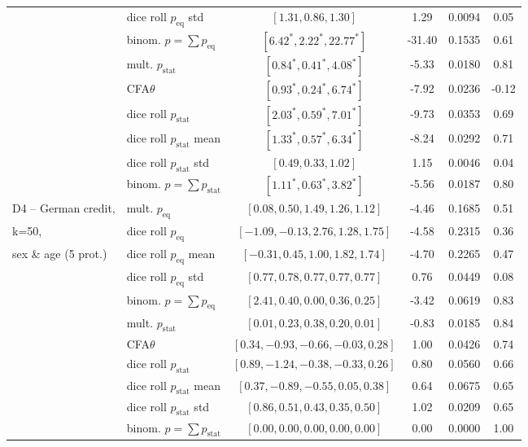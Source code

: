 \begin{table}[t!]
{\begin{tabular}{llcccc}
								& dice roll $p_{\text{eq}}$	std	& $[1.31, 0.86, 1.30]$	& 1.29	& 0.0094 & 0.05\\
								& binom. \algoFAIR $p = \sum p_{\text{eq}}$	& $[6.42^*,2.22^*, 22.77^*]$		&-31.40		& 0.1535 	& 0.61 \\
								\cline{2-6}
								& mult. \algoFAIR  $p_{\text{stat}}$ 	& $[0.84^*, 0.41^*, 4.08^*]$ 	& -5.33		& 0.0180 & 0.81\\
							 	& CFA$\theta$ 					& $[0.93^*, 0.24^*, 6.74^*]$ 	& -7.92		& 0.0236 & -0.12 \\
								& dice roll $p_{\text{stat}}$	& $[2.03^*, 0.59^*, 7.01^*]$	& -9.73		& 0.0353 & 0.69 \\
								& dice roll $p_{\text{stat}}$	mean & $[1.33^*, 0.57^*, 6.34^*]$	& -8.24		& 0.0292 & 0.71 \\
								& dice roll $p_{\text{stat}}$ std	& $[0.49, 0.33, 1.02]$	& 1.15		& 0.0046 & 0.04 \\
								& binom. \algoFAIR $p = \sum p_{\text{stat}}$	& $[1.11^*, 0.63^*, 3.82^*]$		& -5.56		& 0.0187 	& 0.80 \\
		\midrule
		\midrule
		D4 -- German credit, 	& mult. \algoFAIR $p_{\text{eq}}$ 	&  $[0.08, 0.50, 1.49, 1.26, 1.12]$ 	& -4.46 &	0.1685	& 0.51 \\
		k=50,					& dice roll $p_{\text{eq}}$		& $[-1.09, -0.13, 2.76, 1.28, 1.75]$	& -4.58	& 0.2315 & 0.36\\
		sex \& age (5 prot.)	& dice roll $p_{\text{eq}}$	mean	& $[-0.31, 0.45, 1.00, 1.82, 1.74]$	& -4.70	& 0.2265 & 0.47\\
								& dice roll $p_{\text{eq}}$	std	& $[0.77, 0.78, 0.77, 0.77, 0.77]$	& 0.76	& 0.0449 & 0.08\\
								& binom. \algoFAIR $p = \sum p_{\text{eq}}$	& $[2.41,0.40, 0.00, 0.36, 0.25]$	&-3.42	& 0.0619 	& 0.83 \\
								\cline{2-6}
		& mult. \algoFAIR $p_{\text{stat}}$ 	&  $[0.01, 0.23, 0.38, 0.20, 0.01]$		& -0.83 &	0.0185	& 0.84 \\
								& CFA$\theta$ 					&  $[0.34, -0.93, -0.66, -0.03, 0.28]$ 	& 1.00	& 0.0426	& 0.74 \\
								& dice roll $p_{\text{stat}}$	& $[0.89, -1.24, -0.38, -0.33, 0.26]$	& 0.80		& 0.0560 & 0.66 \\
								& dice roll $p_{\text{stat}}$ mean	& $[0.37, -0.89, -0.55, 0.05, 0.38]$	& 0.64		& 0.0675 & 0.65 \\
								& dice roll $p_{\text{stat}}$ std	& $[0.86, 0.51, 0.43, 0.35, 0.50]$	& 1.02		& 0.0209 & 0.65 \\
								& binom. \algoFAIR $p = \sum p_{\text{stat}}$	& $[0.00,0.00, 0.00, 0.00, 0.00]$		& 0.00		& 0.0000	& 1.00 \\


\end{tabular}}
\end{table}
